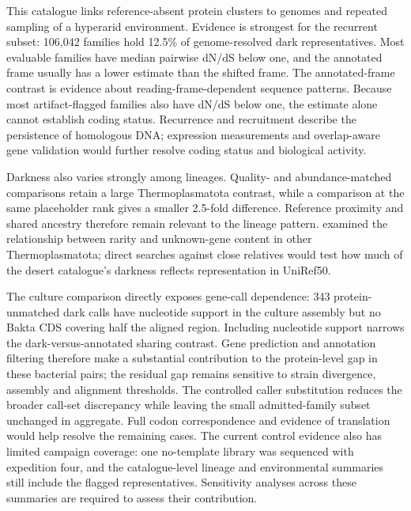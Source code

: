 \documentclass[11pt]{article}
\begin{document}
This catalogue links reference-absent protein clusters to genomes and repeated sampling of a
hyperarid environment. Evidence is strongest for the recurrent subset: 106{,}042 families hold
12.5\% of genome-resolved dark representatives.
Most evaluable families have median pairwise dN/dS below one, and the annotated frame usually
has a lower estimate than the shifted frame. The annotated-frame contrast is evidence about reading-frame-dependent sequence patterns. Because most artifact-flagged families also have dN/dS below one, the estimate alone cannot establish coding status. Recurrence and recruitment describe the
persistence of homologous DNA; expression measurements and overlap-aware gene validation would further resolve coding status and biological activity.

Darkness also varies strongly among lineages. Quality- and abundance-matched comparisons
retain a large Thermoplasmatota contrast, while a comparison at the same placeholder rank gives
a smaller 2.5-fold difference. Reference proximity and shared ancestry therefore remain relevant
to the lineage pattern. \citet{maeke2025thermoplasmatota} examined the relationship between rarity
and unknown-gene content in other Thermoplasmatota; direct searches against close relatives
would test how much of the desert catalogue's darkness reflects representation in UniRef50.

The culture comparison directly exposes gene-call dependence: 343 protein-unmatched dark calls have nucleotide support in the culture assembly but no Bakta CDS covering half the aligned region. Including nucleotide support narrows the dark-versus-annotated sharing contrast. Gene prediction and annotation filtering therefore make a substantial contribution to the protein-level gap in these bacterial pairs; the residual gap remains sensitive to strain divergence, assembly and alignment thresholds. The controlled caller substitution reduces the broader call-set discrepancy while leaving the small admitted-family subset unchanged in aggregate. Full codon correspondence and evidence of translation would help resolve the remaining cases. The current control evidence also has limited campaign
coverage: one no-template library was sequenced with expedition four, and the catalogue-level
lineage and environmental summaries still include the flagged representatives. Sensitivity
analyses across these summaries are required to assess their contribution.
\end{document}
